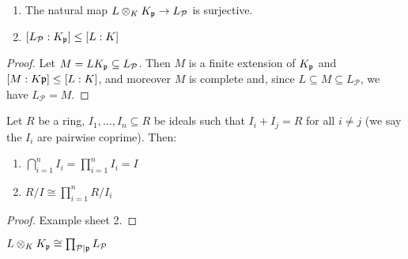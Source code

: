 \documentclass[10pt,a4paper]{article}
\begin{document}
\begin{lemma}\hspace*{0cm}
  \begin{enumerate}
    \item The natural map $L \otimes_K K_{\mathfrak{p}} \to L_{\mathcal{P}}$ is surjective.
    \item $[L_{\mathcal{P}}:K_{\mathfrak{p}}] \leq [L:K]$
  \end{enumerate}
\end{lemma}
\begin{proof}
  Let $M = LK_{\mathfrak{p}} \subseteq L_\mathcal{P}$. Then $M$ is a finite extension of $K_{\mathfrak{p}}$ and $[M:K\mathfrak{p}] \leq [L:K]$, and moreover $M$ is complete and, since $L \subseteq M \subseteq L_\mathcal{P}$, we have $L_\mathcal{P} = M$.
\end{proof}
\begin{lemma}
  Let $R$ be a ring, $I_1, \ldots, I_n \subseteq R$ be ideals such that $I_i + I_j = R$ for all $i \neq j$ (we say the $I_i$ are pairwise coprime). Then:
  \begin{enumerate}
    \item $\bigcap_{i=1}^n I_i = \prod_{i=1}^n I_i = I$
    \item $R/I \cong \prod_{i=1}^n R/I_i$
  \end{enumerate}
\end{lemma}
\begin{proof}
  Example sheet 2.
\end{proof}
\begin{theorem}
  $L \otimes_K K_{\mathfrak{p}} \cong \prod_{\mathcal{P}|\mathfrak{p}} L_\mathcal{P}$
\end{theorem}
\end{document}
